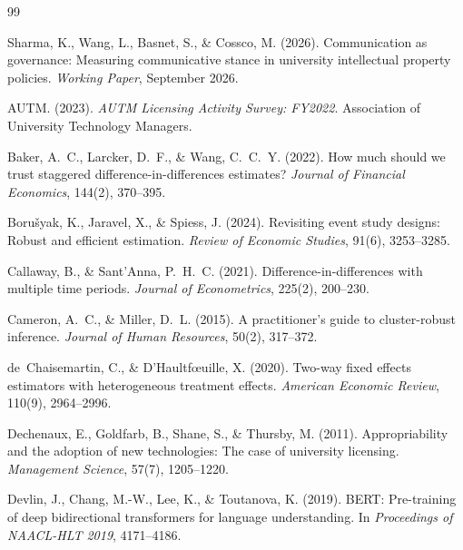 \documentclass[12pt]{article}
\begin{document}


\begin{thebibliography}{99}

Sharma, K., Wang, L., Basnet, S., \& Cossco, M. (2026). Communication as governance:
Measuring communicative stance in university intellectual property policies.
\textit{Working Paper}, September 2026.

AUTM. (2023). \textit{AUTM Licensing Activity Survey: FY2022}. Association of
University Technology Managers.

Baker, A.~C., Larcker, D.~F., \& Wang, C.~C.~Y. (2022). How much should we trust
staggered difference-in-differences estimates? \textit{Journal of Financial Economics},
144(2), 370--395.

Boru\v{s}yak, K., Jaravel, X., \& Spiess, J. (2024). Revisiting event study designs:
Robust and efficient estimation. \textit{Review of Economic Studies}, 91(6), 3253--3285.

Callaway, B., \& Sant'Anna, P.~H.~C. (2021). Difference-in-differences with multiple
time periods. \textit{Journal of Econometrics}, 225(2), 200--230.

Cameron, A.~C., \& Miller, D.~L. (2015). A practitioner's guide to cluster-robust
inference. \textit{Journal of Human Resources}, 50(2), 317--372.

de~Chaisemartin, C., \& D'Haultf{\oe}uille, X. (2020). Two-way fixed effects estimators
with heterogeneous treatment effects. \textit{American Economic Review}, 110(9),
2964--2996.

Dechenaux, E., Goldfarb, B., Shane, S., \& Thursby, M. (2011). Appropriability and
the adoption of new technologies: The case of university licensing. \textit{Management
Science}, 57(7), 1205--1220.

Devlin, J., Chang, M.-W., Lee, K., \& Toutanova, K. (2019). BERT: Pre-training of
deep bidirectional transformers for language understanding. In \textit{Proceedings of
NAACL-HLT 2019}, 4171--4186.


\end{thebibliography}
\end{document}
